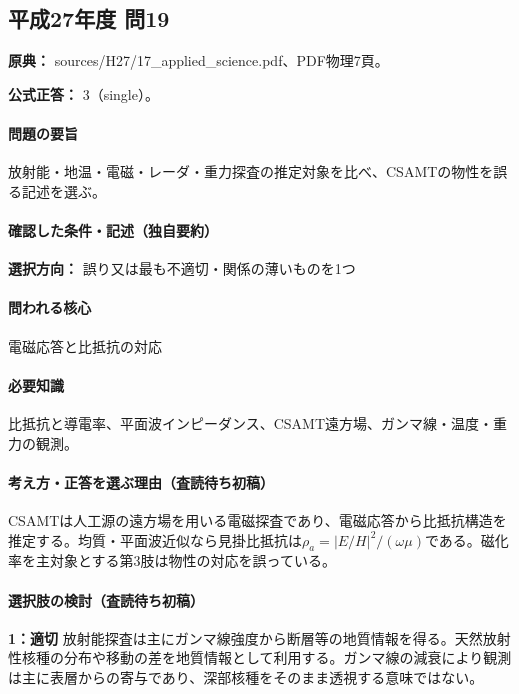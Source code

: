 \subsection{平成27年度 問19}
\label{q:h27-reg-applied-19}

\noindent\textbf{原典：} sources/H27/17\_applied\_science.pdf、PDF物理7頁。

\textbf{公式正答：} 3（single）。

\paragraph{問題の要旨} 放射能・地温・電磁・レーダ・重力探査の推定対象を比べ、CSAMTの物性を誤る記述を選ぶ。

\paragraph{確認した条件・記述（独自要約）}\mbox{}\par

\noindent\textbf{選択方向：} 誤り又は最も不適切・関係の薄いものを1つ\par

\paragraph{問われる核心} 電磁応答と比抵抗の対応

\paragraph{必要知識} 比抵抗と導電率、平面波インピーダンス、CSAMT遠方場、ガンマ線・温度・重力の観測。

\paragraph{考え方・正答を選ぶ理由（査読待ち初稿）} CSAMTは人工源の遠方場を用いる電磁探査であり、電磁応答から比抵抗構造を推定する。均質・平面波近似なら見掛比抵抗は\(\rho_a=|E/H|^2/(\omega\mu)\)である。磁化率を主対象とする第3肢は物性の対応を誤っている。

\paragraph{選択肢の検討（査読待ち初稿）}\mbox{}\par

\noindent\textbf{1：適切} 放射能探査は主にガンマ線強度から断層等の地質情報を得る。天然放射性核種の分布や移動の差を地質情報として利用する。ガンマ線の減衰により観測は主に表層からの寄与であり、深部核種をそのまま透視する意味ではない。\par

